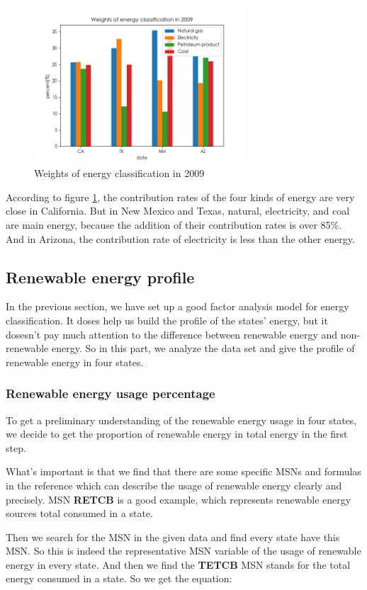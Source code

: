 \documentclass[a4paper,11pt]{article}
\begin{document}
\begin{figure}[H] 
    \centering 
    \includegraphics[width=0.7\textwidth]{./Pic/1-1.png}
    \caption{Weights of energy classification in 2009}
    \label{fig:1-1}
\end{figure}

\par According to figure \ref{fig:1-1}, the contribution rates of the four kinds of energy are very close in California. But in New Mexico and Texas, natural, electricity, and coal are main energy, because the addition of their contribution rates is over 85\%. And in Arizona, the contribution rate of electricity is less than the other energy. 

\subsection{Renewable energy profile}

\par In the previous section, we have set up a good factor analysis model for energy classification. It doses help us build the profile of the states' energy, but it dosesn't pay much attention to the difference between renewable energy and non-renewable energy. So in this part, we analyze the data set and give the profile of renewable energy in four states.

\subsubsection{Renewable energy usage percentage}
\par To get a preliminary understanding of the renewable energy usage in four states, we decide to get the proportion of renewable energy in total energy in the first step.

\par What's important is that we find that there are some specific MSNs and formulas in the reference \cite{4} which can describe the usage of renewable energy clearly and precisely. MSN \textbf{RETCB} is a good example, which represents renewable energy sources total consumed in a state.
\par Then we search for the MSN in the given data and find every state have this MSN. 
So this is indeed the representative MSN variable of the usage of renewable energy in every state. And then we find the \textbf{TETCB} MSN stands for the total energy consumed in a state. So we get the equation:
\end{document}

